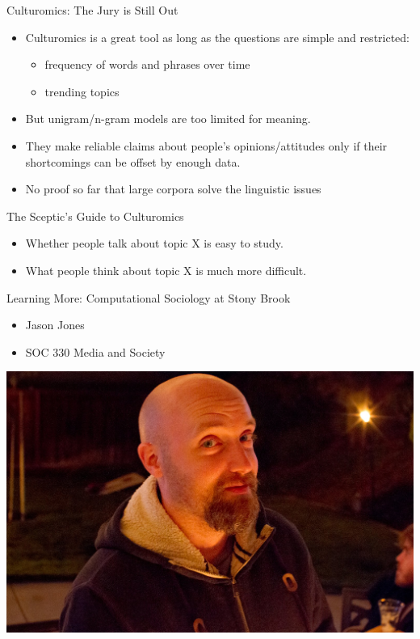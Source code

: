 \documentclass[professionalfonts, xcolor={usenames,svgnames,x11names,table}]{beamer}
\begin{document}
\begin{frame}{Culturomics: The Jury is Still Out}
    \begin{itemize}
        \item Culturomics is a great tool as long as the questions are simple and restricted:
            \begin{itemize}
                \item frequency of words and phrases over time
                \item trending topics
            \end{itemize}
        \item But unigram/n-gram models are too limited for meaning.
        \item They make reliable claims about people's opinions\slash attitudes only if their shortcomings can be offset by enough data.
        \item No proof so far that large corpora solve the linguistic issues
    \end{itemize}

    \pause
    \begin{alertblock}{The Sceptic's Guide to Culturomics}
        \begin{itemize}
            \item Whether people talk about topic X is easy to study.
            \item What people think about topic X is much more difficult.
        \end{itemize}
    \end{alertblock}
\end{frame}

\begin{frame}{Learning More: Computational Sociology at Stony Brook}
    \begin{itemize}
        \item Jason Jones
        \item SOC 330 Media and Society
    \end{itemize}
    \medskip
    \centering
    \includegraphics[width=0.7\linewidth]{./img/jason}
\end{frame}
\end{document}
